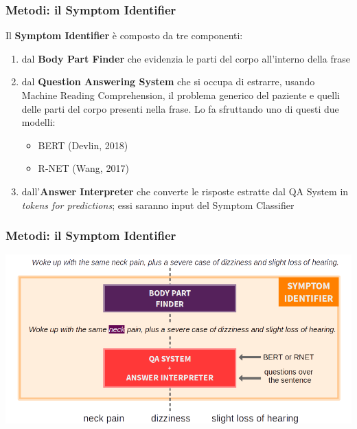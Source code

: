 \documentclass{beamer}
\begin{document}
\begin{frame}
\frametitle{Metodi: il Symptom Identifier}
Il \textbf{Symptom Identifier} è composto da tre componenti:\pause
\begin{enumerate}
 \item dal \textbf{Body Part Finder} che evidenzia le parti del corpo all'interno della frase\pause
 \item dal \textbf{Question Answering System } che si occupa di estrarre, usando Machine Reading Comprehension, il problema generico del paziente e quelli delle parti del corpo presenti nella frase. Lo fa sfruttando uno di questi due modelli:\pause
  \begin{itemize}
    \item BERT (Devlin, 2018) \pause
    \item R-NET (Wang, 2017) \pause%
  \end{itemize}
 \item dall'\textbf{Answer Interpreter} che converte le risposte estratte dal QA System in \emph{tokens for predictions}; essi saranno input del Symptom Classifier
\end{enumerate}
\end{frame}

\begin{frame}
\frametitle{Metodi: il Symptom Identifier}
\includegraphics[width=\textwidth]{images/methods_overview1.png}
\end{frame}
\end{document}
